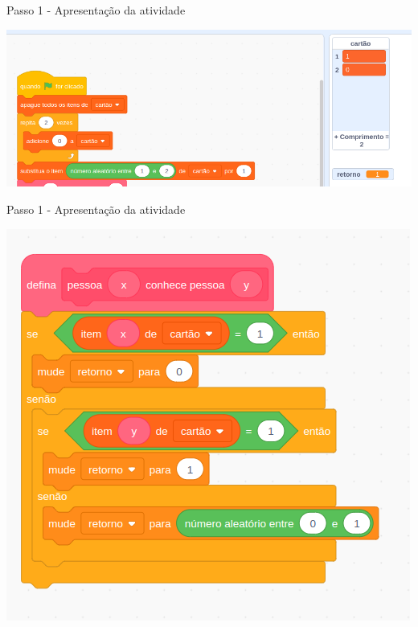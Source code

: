 \documentclass{beamer}
\begin{document}
\begin{frame}{Passo 1 - Apresentação da atividade}




\begin{center}
	\includegraphics[scale=0.35]{images/inicialização.png} 
\end{center}

    


 



\end{frame}


\begin{frame}{Passo 1 - Apresentação da atividade}




\begin{center}
	\includegraphics[scale=0.45]{images/perguntas.png} 
\end{center}

    


 

\end{frame}
\end{document}
